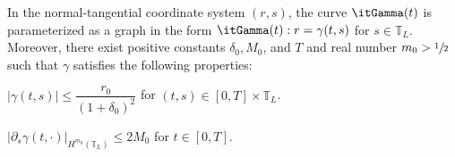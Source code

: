 \begin{assumption}\label{ass:CL}
In the normal-tangential coordinate system $(r,s)$,
the curve $\itGamma(t)$ is parameterized as a graph in the form $\itGamma(t): r=\gamma(t,s)$ for $s\in\mathbb{T}_L$.
Moreover, there exist positive constants $\delta_0,M_0$, and $T$ and real number $m_0>\sfrac12$ such that $\gamma$ satisfies the following properties:
\begin{enumeratei}
\item\label{ass:CLi}
$|\gamma(t,s)| \leq \dfrac{r_0}{(1+\delta_0)^2}$ for $(t,s)\in[0,T]\times\mathbb{T}_L$.

\item\label{ass:CLii}
$|\partial_s\gamma(t,\cdot)|_{H^{m_0}(\mathbb{T}_L)} \leq 2 M_0$ for $t\in[0,T]$.
\end{enumeratei}
\end{assumption}

